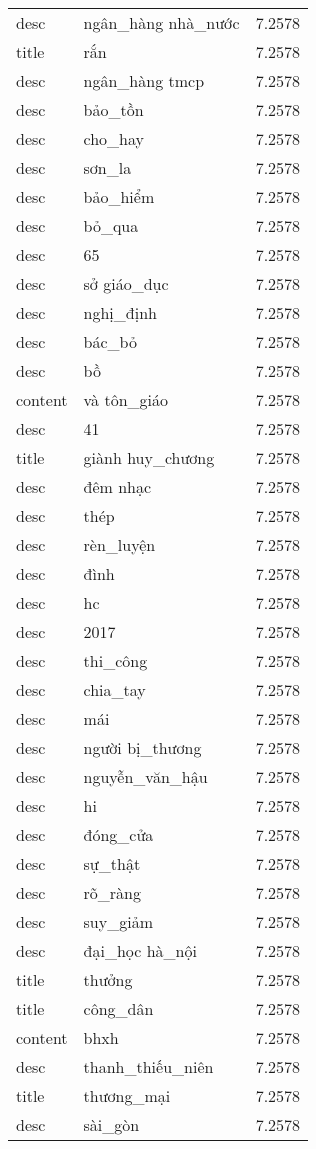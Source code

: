 \documentclass{article}
\begin{document}
\begin{tabular}{lll}
desc & ngân\_hàng nhà\_nước & 7.2578\\
title & rắn & 7.2578\\
desc & ngân\_hàng tmcp & 7.2578\\
desc & bảo\_tồn & 7.2578\\
desc & cho\_hay & 7.2578\\
desc & sơn\_la & 7.2578\\
desc & bảo\_hiểm & 7.2578\\
desc & bỏ\_qua & 7.2578\\
desc & 65 & 7.2578\\
desc & sở giáo\_dục & 7.2578\\
desc & nghị\_định & 7.2578\\
desc & bác\_bỏ & 7.2578\\
desc & bồ & 7.2578\\
content & và tôn\_giáo & 7.2578\\
desc & 41 & 7.2578\\
title & giành huy\_chương & 7.2578\\
desc & đêm nhạc & 7.2578\\
desc & thép & 7.2578\\
desc & rèn\_luyện & 7.2578\\
desc & đình & 7.2578\\
desc & hc & 7.2578\\
desc & 2017 & 7.2578\\
desc & thi\_công & 7.2578\\
desc & chia\_tay & 7.2578\\
desc & mái & 7.2578\\
desc & người bị\_thương & 7.2578\\
desc & nguyễn\_văn\_hậu & 7.2578\\
desc & hi & 7.2578\\
desc & đóng\_cửa & 7.2578\\
desc & sự\_thật & 7.2578\\
desc & rõ\_ràng & 7.2578\\
desc & suy\_giảm & 7.2578\\
desc & đại\_học hà\_nội & 7.2578\\
title & thưởng & 7.2578\\
title & công\_dân & 7.2578\\
content & bhxh & 7.2578\\
desc & thanh\_thiếu\_niên & 7.2578\\
title & thương\_mại & 7.2578\\
desc & sài\_gòn & 7.2578\\

\end{tabular}
\end{document}
